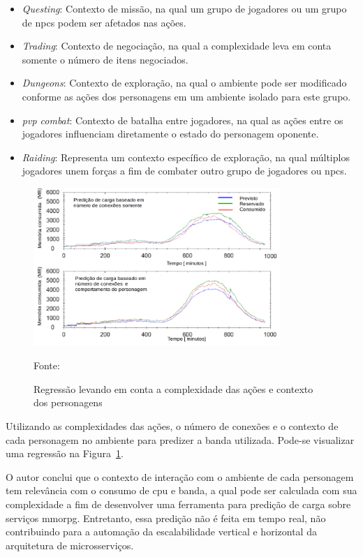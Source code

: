 \begin{itemize}
  \item \textit{Questing}: Contexto de missão, na qual um grupo de jogadores ou um grupo de \acp{npc} podem ser afetados nas ações.
  \item \textit{Trading}: Contexto de negociação, na qual a complexidade leva em conta somente o número de itens negociados.
  \item \textit{Dungeons}: Contexto de exploração, na qual o ambiente pode ser modificado conforme as ações dos personagens em um ambiente isolado para este grupo.
  \item \textit{\ac{pvp} combat}: Contexto de batalha entre jogadores, na qual as ações entre os jogadores influenciam diretamente o estado do personagem oponente.
  \item \textit{Raiding}: Representa um contexto específico de exploração, na qual múltiplos jogadores unem forças a fim de combater outro grupo de jogadores ou \acp{npc}.
\end{itemize}


\begin{figure}[htb!]
\caption{Regressão levando em conta a complexidade das ações e contexto dos personagens}
\label{fig:regressao_complexidade}
\includegraphics[height=6.0cm]{img/cap2/network_regressao_complexidade.png}
\centering

Fonte:~\cite{6374456}
\end{figure}


Utilizando as complexidades das ações, o número de conexões e o contexto de cada personagem no ambiente para predizer a banda utilizada.
%
Pode-se visualizar uma regressão na Figura~\ref{fig:regressao_complexidade}.



O autor conclui que o contexto de interação com o ambiente de cada personagem tem relevância com o consumo de \ac{cpu} e banda, a qual pode ser calculada com sua complexidade a fim de desenvolver uma ferramenta para predição de carga sobre serviços \ac{mmorpg}.
%
Entretanto, essa predição não é feita em tempo real, não contribuindo para a automação da escalabilidade vertical e horizontal da arquitetura de microsserviços.



